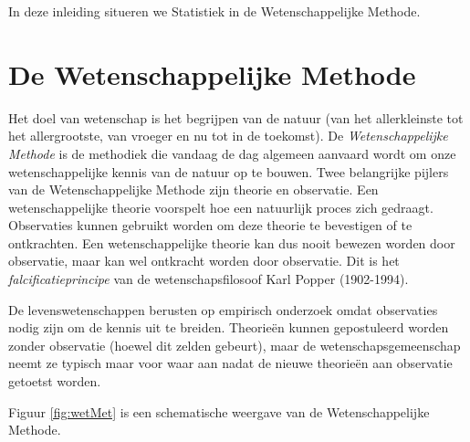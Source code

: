 \documentclass[
  12pt,dutch,coursenotes]{book}
\theoremstyle{definition}
\theoremstyle{definition}
\theoremstyle{definition}
\theoremstyle{remark}
\begin{document}
In deze inleiding situeren we Statistiek in de Wetenschappelijke Methode.

\hypertarget{sec:wetMeth}{%
\section{De Wetenschappelijke Methode}\label{sec:wetMeth}}

Het doel van wetenschap is het begrijpen van de natuur (van het allerkleinste tot het allergrootste, van vroeger en nu tot in de toekomst). De \emph{Wetenschappelijke Methode} is de methodiek die vandaag de dag algemeen aanvaard wordt om onze wetenschappelijke kennis van de natuur op te bouwen. Twee belangrijke pijlers van de Wetenschappelijke Methode zijn theorie en observatie. Een wetenschappelijke theorie voorspelt hoe een natuurlijk proces zich gedraagt. Observaties kunnen gebruikt worden om deze theorie te bevestigen of te ontkrachten. Een wetenschappelijke theorie kan dus nooit bewezen worden door observatie, maar kan wel ontkracht worden door observatie. Dit is het \emph{falcificatieprincipe} van de wetenschapsfilosoof Karl Popper (1902-1994).

De levenswetenschappen berusten op empirisch onderzoek omdat observaties nodig zijn om de kennis uit te breiden. Theorieën kunnen gepostuleerd worden zonder observatie (hoewel dit zelden gebeurt), maar de wetenschapsgemeenschap neemt ze typisch maar voor waar aan nadat de nieuwe theorieën aan observatie getoetst worden.

Figuur \ref{fig:wetMet} is een schematische weergave van de Wetenschappelijke Methode.
\end{document}
